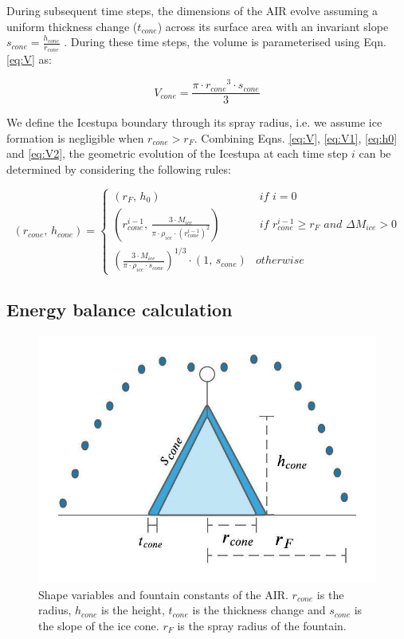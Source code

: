 \documentclass[utf8]{frontiersSCNS}
\begin{document}
During subsequent time steps, the dimensions of the AIR evolve assuming a uniform thickness change ($t_{cone}$)
across its surface area with an invariant slope $s_{cone} = \frac{h_{cone}}{r_{cone}}$ .  During these time
steps, the volume is parameterised using Eqn. \ref{eq:V} as:

\begin{equation} V_{cone} = \frac{\pi \cdot {r_{cone}}^3
		\cdot s_{cone}}{3} \label{eq:V2} \end{equation}

We define the Icestupa boundary through its spray radius, i.e. we assume ice formation is negligible when $r_{cone} >
r_{F}$. Combining Eqns. \ref{eq:V},  \ref{eq:V1}, \ref{eq:h0} and \ref{eq:V2}, the geometric evolution of the
Icestupa at each time step $i$ can be determined by considering the following rules:

\begin{equation} (r_{cone},\, h_{cone}) = \left\{ \begin{array}{ll} (r_F ,\, h_0)                                                                          & \textit{ if } i=0 \\
             (r_{cone}^{i-1},\, \frac{3 \cdot M_{ice}}{\pi \cdot \rho_{ice} \cdot {(r_{cone}^{i-1})}^2}) & \textit{ if }
             r_{cone}^{i-1} \geq r_{F} \textit{ and } \Delta M_{ice} > 0                                                     \\ (\frac{3 \cdot M_{ice}}{\pi \cdot \rho_{ice} \cdot s_{cone}})^{1/3} \cdot (1,\,  s_{cone}) &
             otherwise\end{array} \right.  \label{eq:A2} \end{equation}



\subsection{Energy balance calculation} \label{sec:energy}

\begin{figure}
	\begin{center}
		\includegraphics[width=10 cm]{Figures/shape_parameters.jpeg}
	\end{center}
	\caption{Shape variables and fountain constants of the AIR. $r_{cone}$ is the radius, $h_{cone}$ is the
		height, $t_{cone}$ is the thickness change and $s_{cone}$ is the slope of the ice cone. $r_F$ is the spray
		radius of the fountain.}
	\label{fig:shape}
\end{figure}
\end{document}
